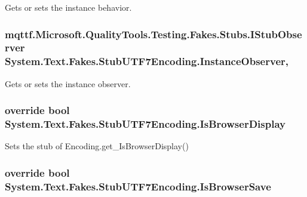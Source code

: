 Gets or sets the instance behavior.

\hypertarget{class_system_1_1_text_1_1_fakes_1_1_stub_u_t_f7_encoding_a0c24d6a5be3d975d15387b2279660112}{
\subsubsection[{Instance\-Observer}]{\setlength{\rightskip}{0pt plus 5cm}mqttf.\-Microsoft.\-Quality\-Tools.\-Testing.\-Fakes.\-Stubs.\-I\-Stub\-Observer System.\-Text.\-Fakes.\-Stub\-U\-T\-F7\-Encoding.\-Instance\-Observer\hspace{0.3cm}{\ttfamily [get]}, {\ttfamily [set]}}}\label{class_system_1_1_text_1_1_fakes_1_1_stub_u_t_f7_encoding_a0c24d6a5be3d975d15387b2279660112}


Gets or sets the instance observer.

\hypertarget{class_system_1_1_text_1_1_fakes_1_1_stub_u_t_f7_encoding_ab946e258d67a830f532239f4ce405ba4}{
\subsubsection[{Is\-Browser\-Display}]{\setlength{\rightskip}{0pt plus 5cm}override bool System.\-Text.\-Fakes.\-Stub\-U\-T\-F7\-Encoding.\-Is\-Browser\-Display\hspace{0.3cm}{\ttfamily [get]}}}\label{class_system_1_1_text_1_1_fakes_1_1_stub_u_t_f7_encoding_ab946e258d67a830f532239f4ce405ba4}


Sets the stub of Encoding.\-get\-\_\-\-Is\-Browser\-Display()

\hypertarget{class_system_1_1_text_1_1_fakes_1_1_stub_u_t_f7_encoding_a36ffd7385713cd97ea0cf4a90d05e4d5}{
\subsubsection[{Is\-Browser\-Save}]{\setlength{\rightskip}{0pt plus 5cm}override bool System.\-Text.\-Fakes.\-Stub\-U\-T\-F7\-Encoding.\-Is\-Browser\-Save\hspace{0.3cm}{\ttfamily [get]}}}\label{class_system_1_1_text_1_1_fakes_1_1_stub_u_t_f7_encoding_a36ffd7385713cd97ea0cf4a90d05e4d5}


